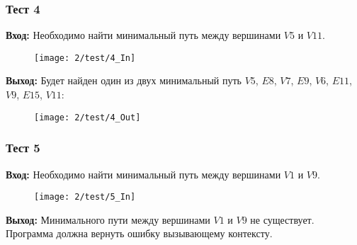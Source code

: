 \newpage

\subsubsection{Тест 4}
\textbf{Вход:}
Необходимо найти минимальный путь между вершинами $V5$ и $V11$. 

\begin{figure}[h!]
  \centering
  \texttt{[image: 2/test/4\_In]}
  \label{fig:Test4_In}
\end{figure}


\textbf{Выход:}
Будет найден один из двух минимальный путь $V5$, $E8$, $V7$, $E9$, $V6$, $E11$, $V9$, $E15$, $V11$:

\begin{figure}[h!]
  \centering
  \texttt{[image: 2/test/4\_Out]}
  \label{fig:Test4_Out}
\end{figure}

\newpage

\subsubsection{Тест 5} 
\textbf{Вход:}
Необходимо найти минимальный путь между вершинами $V1$ и $V9$.

\begin{figure}[h!]
  \centering
  \texttt{[image: 2/test/5\_In]}
  \label{fig:Test5_In}
\end{figure}

 
\textbf{Выход:}
Минимального пути между вершинами $V1$ и $V9$ не существует. Программа должна вернуть ошибку вызывающему контексту.

